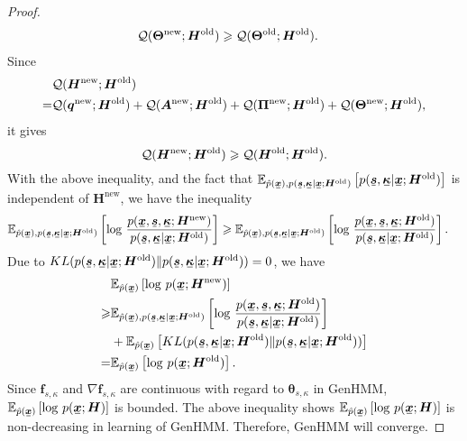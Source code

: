 \begin{proof}
\begin{align*}
    \mathcal{Q}(\bm{\Theta}^{\mathrm{new}}; \bm{H}^{\mathrm{old}}) &\geqslant \mathcal{Q}(\bm{\Theta}^{\mathrm{old}}; \bm{H}^{\mathrm{old}}).
  \end{align*}
  Since
  \begin{align*}
    &\mathcal{Q}(\bm{H}^{\mathrm{new}}; \bm{H}^{\mathrm{old}}) \nonumber \\
      = &\mathcal{Q}(\bm{q}^{\mathrm{new}}; \bm{H}^{\mathrm{old}}) + \mathcal{Q}(\bm{A}^{\mathrm{new}}; \bm{H}^{\mathrm{old}}) + \mathcal{Q}(\bm{\Pi}^{\mathrm{new}}; \bm{H}^{\mathrm{old}})
                                                          + \mathcal{Q}(\bm{\Theta}^{\mathrm{new}}; \bm{H}^{\mathrm{old}}),
  \end{align*}
  it gives
  \begin{equation*}
    \mathcal{Q}(\bm{H}^{\mathrm{new}}; \bm{H}^{\mathrm{old}}) \geqslant \mathcal{Q}(\bm{H}^{\mathrm{old}}; \bm{H}^{\mathrm{old}}).
  \end{equation*}
  With the above inequality, and the fact that $\EE_{\hat{p}(\ubm{x}),p(\ubm{s},\ubm{\kappa}| \ubm{x}; \bm{H}^{\mathrm{old}})}\left[p(\ubm{s}, \ubm{\kappa}|\ubm{x}; \bm{H}^{\mathrm{old}})\right]$ is independent of $\bm{H}^{\mathrm{new}}$, we have the inequality 
  \begin{align*}
    &\EE_{\hat{p}(\ubm{x}),p(\ubm{s},\ubm{\kappa}| \ubm{x}; \bm{H}^{\mathrm{old}})}\left[ \log\,\frac{p(\ubm{x}, \ubm{s}, \ubm{\kappa}; \bm{H}^{\mathrm{new}})}{p(\ubm{s}, \ubm{\kappa}|\ubm{x}; \bm{H}^{\mathrm{old}})}\right] 
    \geq \EE_{\hat{p}(\ubm{x}),p(\ubm{s},\ubm{\kappa}| \ubm{x}; \bm{H}^{\mathrm{old}})}\left[ \log\,\frac{p(\ubm{x}, \ubm{s}, \ubm{\kappa}; \bm{H}^{\mathrm{old}})}{p(\ubm{s}, \ubm{\kappa}|\ubm{x}; \bm{H}^{\mathrm{old}})}\right].
  \end{align*}
  Due to $KL(p(\ubm{s}, \ubm{\kappa}|\ubm{x};
  \bm{H}^{\mathrm{old}})\|p(\ubm{s}, \ubm{\kappa}|\ubm{x};
  \bm{H}^{\mathrm{old}}))=0$, we have
  \begin{align*}
    &\EE_{\hat{p}(\ubm{x})}\left[ \log\,p(\ubm{x};\bm{H}^{\mathrm{new}}) \right] \nonumber \\
    \geq & \EE_{\hat{p}(\ubm{x}),p(\ubm{s},\ubm{\kappa}| \ubm{x};
           \bm{H}^{\mathrm{old}})}\left[ \log\,\frac{p(\ubm{x},
           \ubm{s}, \ubm{\kappa}; \bm{H}^{\mathrm{old}})}{p(\ubm{s},
           \ubm{\kappa}|\ubm{x}; \bm{H}^{\mathrm{old}})}\right] \nonumber \\
           &+ \EE_{\hat{p}(\ubm{x})}\left[ KL(p(\ubm{s}, \ubm{\kappa}|\ubm{x}; \bm{H}^{\mathrm{old}})\|p(\ubm{s}, \ubm{\kappa}|\ubm{x}; \bm{H}^{\mathrm{old}})) \right]
      \nonumber \\
    = & \EE_{\hat{p}(\ubm{x})}\left[ \log\,p(\ubm{x};\bm{H}^{\mathrm{old}}) \right].
  \end{align*}
  Since $\bm{f}_{s,\kappa}$ and  ${\nabla\bm{f}_{s,\kappa}}$ are continuous with regard to ${\bm\theta}_{s,\kappa}$ in GenHMM, $\EE_{\hat{p}(\ubm{x})}\left[ \log\,p(\ubm{x};\bm{H}) \right]$ is bounded. The above inequality shows $\EE_{\hat{p}(\ubm{x})}\left[ \log\,p(\ubm{x};\bm{H}) \right]$ is non-decreasing in learning of GenHMM. Therefore, GenHMM will converge.
  

\end{proof}
